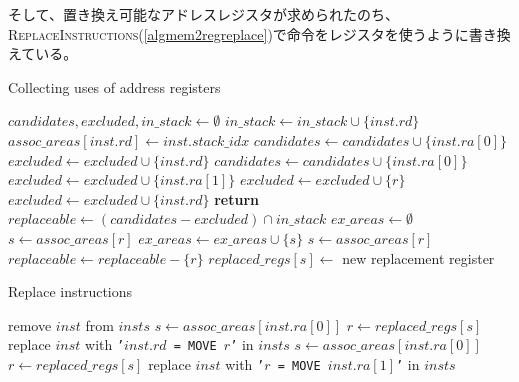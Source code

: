 \documentclass[uplatex,a4paper]{jsarticle}
\begin{document}
そして、置き換え可能なアドレスレジスタが求められたのち、\textsc{ReplaceInstructions}(\cref{algmem2regreplace})で命令をレジスタを使うように書き換えている。

\begin{algorithm}
\caption{Collecting uses of address registers}\label{algmem2regcollect}
\begin{algorithmic}[1]
  \State $candidates, excluded, in\_stack \gets \emptyset$
      \State $in\_stack \gets in\_stack \cup{ \{inst.rd\} }$
      \State $assoc\_areas[inst.rd] \gets inst.stack\_idx$
      \State $candidates \gets candidates \cup{ \{inst.ra[0]\} }$
      \State $excluded \gets excluded \cup{ \{inst.rd\} }$
      \State $candidates \gets candidates \cup{ \{inst.ra[0]\} }$
      \State $excluded \gets excluded \cup{ \{inst.ra[1]\} }$
    \Else
        \State $excluded \gets excluded \cup{ \{r\} }$
      \EndFor
        \State $excluded \gets excluded \cup{ \{inst.rd\} }$
      \EndIf
    \EndIf
  \EndFor
  \State \textbf{return} 
\EndFunction
{}
  \State $replaceable \gets (candidates - excluded) \cap {in\_stack}$
  \State $ex\_areas \gets \emptyset$
      \State $s \gets assoc\_areas[r]$
      \State $ex\_areas \gets ex\_areas \cup{\{s\}}$
    \EndIf
  \EndFor
    \State $s \gets assoc\_areas[r]$
      \State $replaceable \gets replaceable - \{r\}$
    \Else
        \State $replaced\_regs[s] \gets$ new replacement register
      \EndIf
    \EndIf
  \EndFor
\EndFunction
\end{algorithmic}
\end{algorithm}

\begin{algorithm}
\caption{Replace instructions}\label{algmem2regreplace}
\begin{algorithmic}[1]
        \State remove $inst$ from $insts$
      \EndIf
        \State $s \gets assoc\_areas[inst.ra[0]]$
        \State $r \gets replaced\_regs[s]$
        \State replace $inst$ with \texttt{'$inst.rd$ = MOVE $r$'} in $insts$
      \EndIf
        \State $s \gets assoc\_areas[inst.ra[0]]$
        \State $r \gets replaced\_regs[s]$
        \State replace $inst$ with \texttt{'$r$ = MOVE $inst.ra[1]$'} in $insts$
      \EndIf
    \EndIf
  \EndFor
\EndProcedure
\end{algorithmic}
\end{algorithm}
\end{document}
